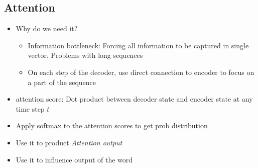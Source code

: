 \documentclass[a4paper]{article}
\begin{document}
\begin{itemize}
\section{Attention}
\begin{itemize}
    \item Why do we need it?
    \begin{itemize}
        \item Information bottleneck: Forcing all information to be captured in single vector. Problems with long sequences
        \item On each step of the decoder, use direct connection to encoder to focus on a part of the sequence
    \end{itemize}
    \item attention score: Dot product between decoder state and encoder state at any time step $t$ 
    \item Apply softmax to the attention scores to get prob distribution
    \item Use it to product \textit{Attention output} 
    \item Use it to influence output of the word
\end{itemize}
\end{itemize}
\end{document}
